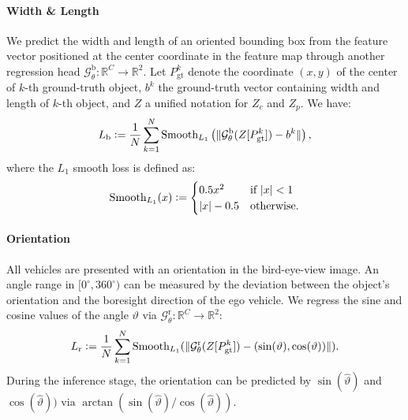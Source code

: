 \documentclass[10pt,twocolumn,letterpaper]{article}
\newcommand{\RR}{\mathbb{R}}
\newcommand{\defeq}{\vcentcolon=}
\begin{document}
\paragraph{Width \& Length} We predict the width and length of an oriented bounding box from the feature vector positioned at the center coordinate in the feature map through another regression head $\mathcal{G}_\theta^{\text{b}}: \RR^C \rightarrow \RR^2$. Let $P_{\text{gt}}^k$ denote the coordinate $(x, y)$ of the center of $k$-th ground-truth object, $b^k$ the ground-truth vector containing width and length of $k$-th object, and $Z$ a unified notation for $Z_c$ and $Z_p$. We have:
\begin{equation}
    L_\text{b} \defeq \frac{1}{N}\sum_{k=1}^{N} \text{Smooth}_{L_1} \left(\lVert\mathcal{G}_\theta^\text{b}(Z[P_{\text{gt}}^k]) - b^k \rVert \right),
\end{equation}
where the $L_1$ smooth loss is defined as:
\begin{equation}
    \text{Smooth}_{L_1}(x) \defeq
    \begin{cases}
      0.5x^2 & \text{if}\ |x|<1\\
      |x|-0.5 & \text{otherwise}.\\
    \end{cases}     
\end{equation}

\vspace{-4mm}
\paragraph{Orientation} All vehicles are presented with an orientation in the bird-eye-view image. An angle range in $[0^{\circ}, 360^{\circ})$ can be measured by the deviation between the object's orientation and the boresight direction of the ego vehicle. We regress the sine and cosine values of the angle $\vartheta$ via $\mathcal{G}_\theta^{\text{r}}: \RR^C \rightarrow \RR^2$:
\begin{equation}
    L_\text{r} \defeq \frac{1}{N}\sum_{k=1}^{N} \text{Smooth}_{L_1}(\lVert \mathcal{G}_\theta^\text{r}(Z[P_{\text{gt}}^k]) - (\sin(\vartheta), \cos(\vartheta)) \rVert).
\end{equation}
During the inference stage, the orientation can be predicted by ${\sin(\hat{\vartheta})}$ and ${\cos(\hat{\vartheta})})$ via $\arctan({\sin(\hat{\vartheta})} / {\cos(\hat{\vartheta})})$.

\vspace{-4mm}
\end{document}
